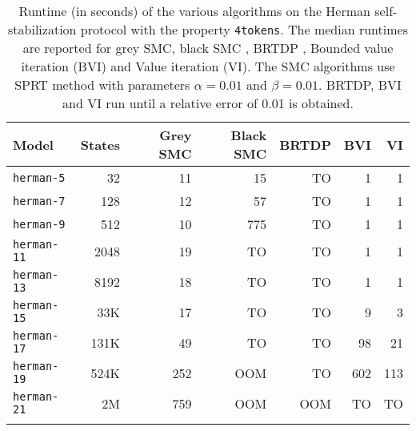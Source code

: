 \begin{table}[t]
\centering
\caption{Runtime (in seconds) of the various algorithms on the Herman self-stabilization protocol \cite{HermanPrism} with the property \texttt{4tokens}. The median runtimes are reported for grey SMC, black SMC \cite{DHKPjournal}, BRTDP \cite{atva14}, Bounded value iteration (BVI) and Value iteration (VI). The SMC algorithms use SPRT method with parameters $\alpha = 0.01$ and $\beta = 0.01$. BRTDP, BVI and VI run until  a relative error of 0.01 is obtained.}
\label{tab:herman-short}
\setlength{\tabcolsep}{6pt} %
\setlength{\aboverulesep}{0pt}
\setlength{\belowrulesep}{0pt}
\begin{tabular}{@{}lrrr|rrr@{}}
	\toprule
	Model     & States & Grey SMC & Black SMC & BRTDP & BVI &  VI \\ \midrule
	\texttt{herman-5}     & 32 &       11 &   15 &    TO &   1 &   1 \\
	\texttt{herman-7}     & 128 &       12 &   57 &    TO &   1 &   1 \\
	\texttt{herman-9}     & 512 &       10 &  775 &    TO &   1 &   1 \\
	\texttt{herman-11}     & 2048 &       19 &   TO &    TO &   1 &   1 \\
	\texttt{herman-13}     & 8192 &       18 &   TO &    TO &   1 &   1 \\
	\texttt{herman-15}     & 33K &       17 &   TO &    TO &   9 &   3 \\
	\texttt{herman-17}     & 131K &       49 &   TO &    TO &  98 &  21 \\
	\texttt{herman-19}     & 524K &      252 &  OOM &    TO &  602 & 113 \\
	\texttt{herman-21}     & 2M &      759 &  OOM &   OOM &  TO &  TO \\ \bottomrule& 
\end{tabular}
\end{table}
